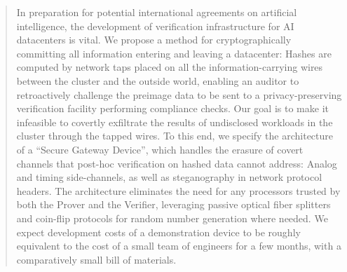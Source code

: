 \documentclass{article}
\begin{document}

\printAffiliationsAndNotice{}

\begin{abstract}
In preparation for potential international agreements on artificial intelligence, the development of verification infrastructure for AI datacenters is vital. We propose a method for cryptographically committing all information entering and leaving a datacenter: Hashes are computed by network taps placed on all the information-carrying wires between the cluster and the outside world, enabling an auditor to retroactively challenge the preimage data to be sent to a privacy-preserving verification facility performing compliance checks. Our goal is to make it infeasible to covertly exfiltrate the results of undisclosed workloads in the cluster through the tapped wires. To this end, we specify the architecture of a ``Secure Gateway Device'', which handles the erasure of covert channels that post-hoc verification on hashed data cannot address: Analog and timing side-channels, as well as steganography in network protocol headers. The architecture eliminates the need for any processors trusted by both the Prover and the Verifier, leveraging passive optical fiber splitters and coin-flip protocols for random number generation where needed. We expect development costs of a demonstration device to be roughly equivalent to the cost of a small team of engineers for a few months, with a comparatively small bill of materials.
\end{abstract}
\end{document}
